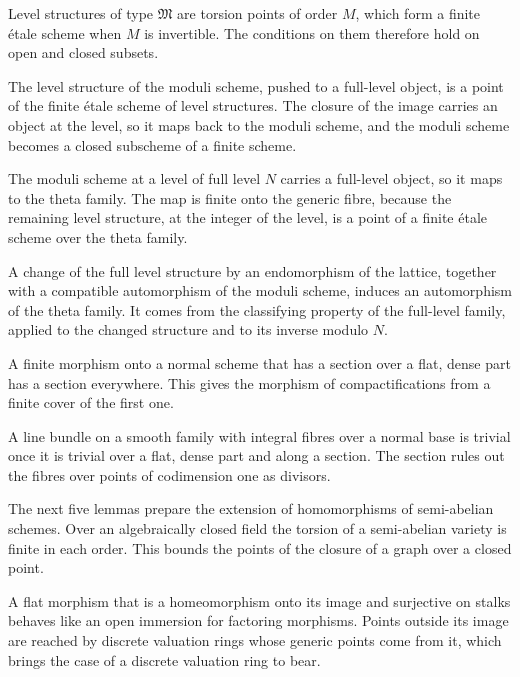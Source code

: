 Level structures of type $\mathfrak M$ are torsion points of order $M$, which form a finite \'etale scheme
when $M$ is invertible. The conditions on them therefore hold on open and closed subsets.

The level structure of the moduli scheme, pushed to a full-level object, is a point of the finite
\'etale scheme of level structures. The closure of the image carries an object at the level, so it maps
back to the moduli scheme, and the moduli scheme becomes a closed subscheme of a finite scheme.

The moduli scheme at a level of full level $N$ carries a full-level object, so it maps to the theta
family. The map is finite onto the generic fibre, because the remaining level structure, at the
integer of the level, is a point of a finite \'etale scheme over the theta family.

A change of the full level structure by an endomorphism of the lattice, together with a compatible
automorphism of the moduli scheme, induces an automorphism of the theta family. It comes from the
classifying property of the full-level family, applied to the changed structure and to its inverse
modulo $N$.

A finite morphism onto a normal scheme that has a section over a flat, dense part has a section
everywhere. This gives the morphism of compactifications from a finite cover of the first one.

A line bundle on a smooth family with integral fibres over a normal base is trivial once it is trivial
over a flat, dense part and along a section. The section rules out the fibres over points of codimension
one as divisors.

The next five lemmas prepare the extension of homomorphisms of semi-abelian schemes. Over an algebraically
closed field the torsion of a semi-abelian variety is finite in each order. This bounds the points of the closure
of a graph over a closed point.

A flat morphism that is a homeomorphism onto its image and surjective on stalks behaves like an open immersion
for factoring morphisms. Points outside its image are reached by discrete valuation rings whose generic points
come from it, which brings the case of a discrete valuation ring to bear.

